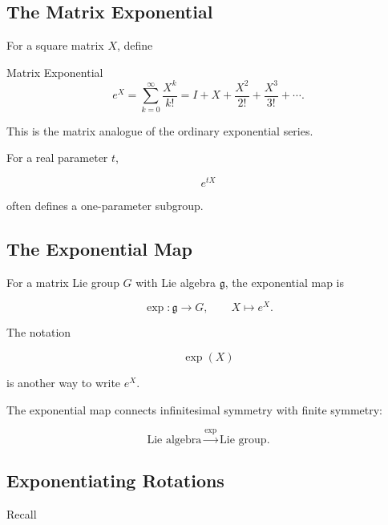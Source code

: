 \subsection{The Matrix Exponential}
\label{subsec:matrix-exponential}

For a square matrix \(X\), define

\begin{definitionbox}{Matrix Exponential}
\[ e^X=\sum_{k=0}^{\infty}\frac{X^k}{k!}
=I+X+\frac{X^2}{2!}+\frac{X^3}{3!}+\cdots. \]
\end{definitionbox}

This is the matrix analogue of the ordinary exponential series.

For a real parameter \(t\),

\[ e^{tX} \]

often defines a one-parameter subgroup.

\subsection{The Exponential Map}
\label{subsec:lie-exponential-map}

For a matrix Lie group \(G\) with Lie algebra \(\mathfrak g\), the
exponential map is

\[ \exp:\mathfrak g\to G,\qquad X\mapsto e^X. \]

The notation

\[ \exp(X) \]

is another way to write \(e^X\).

\begin{conceptbox}
The exponential map connects infinitesimal symmetry with finite symmetry:

\[ \boxed{\text{Lie algebra}\xrightarrow{\exp}\text{Lie group}.} \]
\end{conceptbox}

\subsection{Exponentiating Rotations}
\label{subsec:exponentiating-rotations}

Recall

